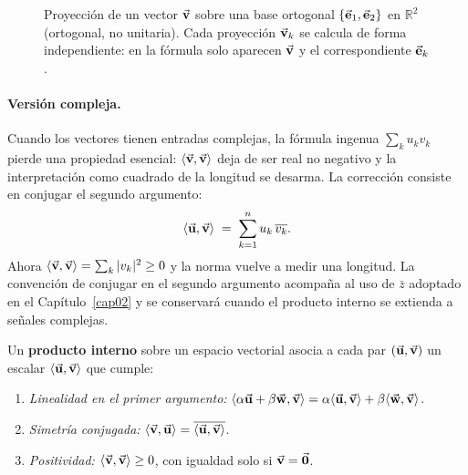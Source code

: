 \documentclass[class=book, crop=false]{standalone}
\begin{document}
\begin{figure}[H]
    \centering
    \begin{minipage}{\linewidth}
        \centering
        
        \caption{Proyección de un vector $\vec{\mathbf{v}}$ sobre una base
                 ortogonal $\{\vec{\mathbf{e}}_1,\vec{\mathbf{e}}_2\}$ en $\mathbb{R}^2$
                 (ortogonal, no unitaria). Cada proyección $\vec{\mathbf{v}}_k$ se
                 calcula de forma independiente: en la fórmula solo aparecen
                 $\vec{\mathbf{v}}$ y el correspondiente $\vec{\mathbf{e}}_k$.}
        \label{fig:proyeccion_R2}
    \end{minipage}
\end{figure}

\paragraph{Versión compleja.}
Cuando los vectores tienen entradas complejas, la fórmula ingenua
$\sum_k u_k v_k$ pierde una propiedad esencial: $\langle\vec{\mathbf{v}},\vec{\mathbf{v}}\rangle$
deja de ser real no negativo y la interpretación como cuadrado de la
longitud se desarma. La corrección consiste en conjugar el segundo
argumento:
\begin{equation}
    \langle \vec{\mathbf{u}},\vec{\mathbf{v}}\rangle \;=\; \sum_{k=1}^{n} u_k\,\overline{v_k}.
    \label{eq:pi_Cn}
\end{equation}
Ahora $\langle\vec{\mathbf{v}},\vec{\mathbf{v}}\rangle = \sum_k |v_k|^2 \geq 0$ y la
norma vuelve a medir una longitud. La convención de conjugar en el segundo
argumento acompaña al uso de $\bar{z}$ adoptado en el Capítulo~\ref{cap02}
y se conservará cuando el producto interno se extienda a señales complejas.

\begin{resultado}
Un \textbf{producto interno} sobre un espacio vectorial asocia a cada par
$(\vec{\mathbf{u}},\vec{\mathbf{v}})$ un escalar $\langle\vec{\mathbf{u}},\vec{\mathbf{v}}\rangle$
que cumple:
\begin{enumerate}[label=(\roman*), leftmargin=*]
    \item \textit{Linealidad en el primer argumento:}
          $\langle\alpha\vec{\mathbf{u}} + \beta\vec{\mathbf{w}},\vec{\mathbf{v}}\rangle
           = \alpha\langle\vec{\mathbf{u}},\vec{\mathbf{v}}\rangle + \beta\langle\vec{\mathbf{w}},\vec{\mathbf{v}}\rangle$.
    \item \textit{Simetría conjugada:}
          $\langle\vec{\mathbf{v}},\vec{\mathbf{u}}\rangle = \overline{\langle\vec{\mathbf{u}},\vec{\mathbf{v}}\rangle}$.
    \item \textit{Positividad:}
          $\langle\vec{\mathbf{v}},\vec{\mathbf{v}}\rangle \geq 0$, con igualdad solo si $\vec{\mathbf{v}} = \vec{\mathbf{0}}$.
\end{enumerate}
\end{resultado}
\end{document}
